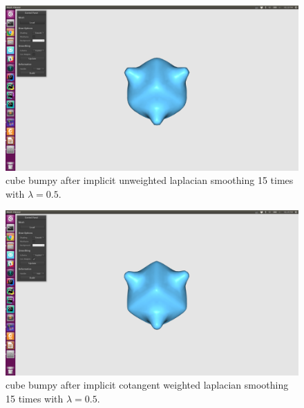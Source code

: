 \documentclass[twocolumn, a4paper]{article}
\begin{document}
\begin{figure}[H]
	\centering
	\includegraphics[width=1.0\linewidth]{cube_bumpy_in_15.png}
	\caption{cube bumpy after implicit unweighted laplacian smoothing 15 times with $\lambda=0.5$.}
\end{figure}
\begin{figure}[H]
	\centering
	\includegraphics[width=1.0\linewidth]{cube_bumpy_ic_15.png}
	\caption{cube bumpy after implicit cotangent weighted laplacian smoothing 15 times with $\lambda=0.5$.}
\end{figure}
\end{document}
